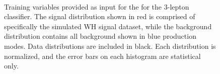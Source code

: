 {\begin{figure}[h!]
 \\
\caption{Training variables provided as input for the for the 3-lepton classifier. The signal distribution shown in red is comprised of specifically the simulated WH signal dataset, while the background distribution contains all background shown in blue production modes. Data distributions are included in black. Each distribution is normalized, and the error bars on each histogram are statistical only. }
\label{fig:hmm3lepVars}
\end{figure}
\clearpage
}

